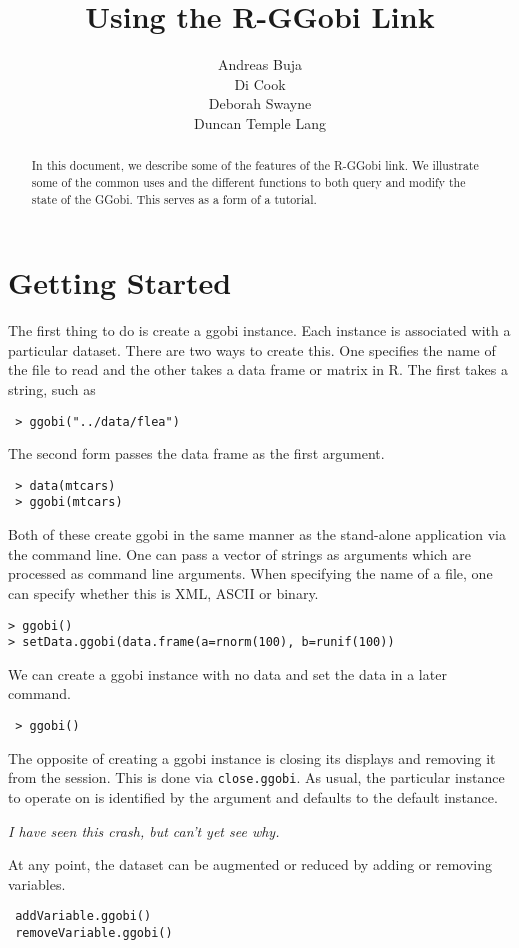 \documentclass{article}
\title{Using the R-GGobi Link}
\author{Andreas Buja \\
Di Cook \\
Deborah Swayne \\
Duncan Temple Lang}
\def\SFunction#1{{\texttt{\red #1}}}
\def\note#1{\textsl{\red #1}}
\begin{document}
\begin{abstract}
  In this document, we describe some of the features of the R-GGobi
  link. We illustrate some of the common uses and the different
  functions to both query and modify the state of the GGobi.  This
  serves as a form of a tutorial.
\end{abstract}

\maketitle{}


\section{Getting Started}
The first thing to do is create a ggobi instance.
Each instance is associated with a particular dataset.
There are two ways to create this.
One specifies the name of the file to read
and the other takes a data frame or matrix in R.
The first takes a string, such as
\begin{verbatim}
 > ggobi("../data/flea")
\end{verbatim}
The second form passes the data frame as the first argument.
\begin{verbatim}
 > data(mtcars)
 > ggobi(mtcars)
\end{verbatim}
Both of these create ggobi in the same manner as the stand-alone
application via the command line.  One can pass a vector of strings as
arguments which are processed as command line arguments.  When
specifying the name of a file, one can specify whether this is XML,
ASCII or binary.

\begin{verbatim}
> ggobi()
> setData.ggobi(data.frame(a=rnorm(100), b=runif(100))
\end{verbatim}

We can create a ggobi instance with no data and set the data in a
later command.
\begin{verbatim}
 > ggobi()
\end{verbatim}


The opposite of creating a ggobi instance is closing its displays and
removing it from the session.  This is done via
\SFunction{close.ggobi}.  As usual, the particular instance to operate
on is identified by the  argument and defaults to the
default instance.

\note{I have seen this crash, but can't yet see why.}


At any point, the dataset can be augmented or reduced by
adding or removing variables.
\begin{verbatim}
 addVariable.ggobi()
 removeVariable.ggobi()
\end{verbatim}
\end{document}
